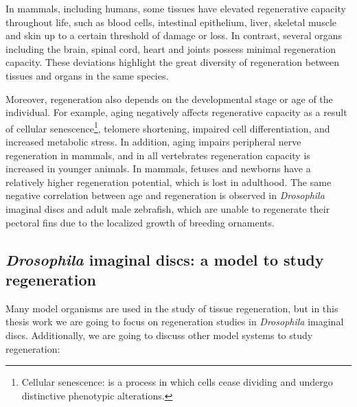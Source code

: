 In mammals, including humans, some tissues have elevated regenerative capacity throughout life, such as blood cells, intestinal epithelium, liver, skeletal muscle and skin up to a certain threshold of damage or loss. In contrast, several organs including the brain, spinal cord, heart and joints possess minimal regeneration capacity.\autocite{goldman_2020_tissue_regeneration} These deviations highlight the great diversity of regeneration between tissues and organs in the same species. 

Moreover, regeneration also depends on the developmental stage or age of the individual. For example, aging negatively affects regenerative capacity as a result of cellular senescence\footnote{Cellular senescence: is a process in which cells cease dividing and undergo distinctive phenotypic alterations.}, telomere shortening, impaired cell differentiation, and increased metabolic stress.\autocite{iismaa_2018_comparative} In addition, aging impairs peripheral nerve regeneration in mammals, and in all vertebrates regeneration capacity is increased in younger animals. In mammals, fetuses and newborns have a relatively higher regeneration potential, which is lost in adulthood.\autocite{vizcaya_2020_chromatin} The same negative correlation between age and regeneration is observed in \textit{Drosophila} imaginal discs and adult male zebrafish, which are unable to regenerate their pectoral fins due to the localized growth of breeding ornaments.\autocite{hariharan_2017_imaginal,vizcaya_2020_chromatin,chen_2017_regeneration_genetics}

\subsection{\textit{Drosophila} imaginal discs: a model to study regeneration}
\label{subsec:dme_imaginal_discs}

Many model organisms are used in the study of tissue regeneration, but in this thesis work we are going to focus on regeneration studies in \textit{Drosophila} imaginal discs. Additionally,  we are going to discuss other model systems to study regeneration:


